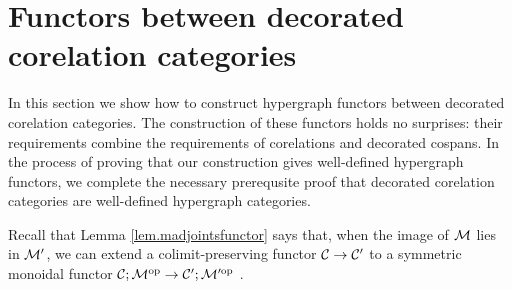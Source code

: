
\section{Functors between decorated corelation categories} \label{sec.dcorf}
In this section we show how to construct hypergraph functors between decorated
corelation categories. The construction of these functors holds no surprises:
their requirements combine the requirements of corelations and decorated
cospans. In the process of proving that our construction gives well-defined
hypergraph functors, we complete the necessary prerequsite proof that decorated
corelation categories are well-defined hypergraph categories.

Recall that Lemma \ref{lem.madjointsfunctor} says that, when the image of $\mathcal
M$ lies in $\mathcal M'$, we can extend a colimit-preserving functor $\mathcal C \to \mathcal
C'$ to a symmetric monoidal functor $\mathcal C;\mathcal M^{\mathrm{op}} \to \mathcal C';\mathcal M'^{\mathrm{op}}$ .

